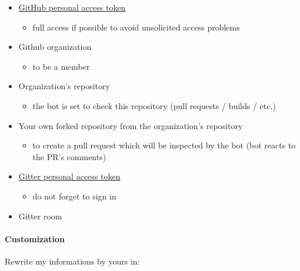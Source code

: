 \begin{itemize}
\tightlist
\item
  \href{https://github.com/settings/tokens}{GitHub personal access
  token}

  \begin{itemize}
  \tightlist
  \item
    full access if possible to avoid unsolicited access problems
  \end{itemize}
\item
  Github organization

  \begin{itemize}
  \tightlist
  \item
    to be a member
  \end{itemize}
\item
  Organization's repository

  \begin{itemize}
  \tightlist
  \item
    the bot is set to check this repository (pull requests / builds /
    etc.)
  \end{itemize}
\item
  Your own forked repository from the organization's repository

  \begin{itemize}
  \tightlist
  \item
    to create a pull request which will be inspected by the bot (bot
    reacts to the PR's comments)
  \end{itemize}
\item
  \href{https://developer.gitter.im/apps}{Gitter personal access token}

  \begin{itemize}
  \tightlist
  \item
    do not forget to sign in
  \end{itemize}
\item
  Gitter room
\end{itemize}

\paragraph{Customization}\label{customization}

Rewrite my informations by yours in:

